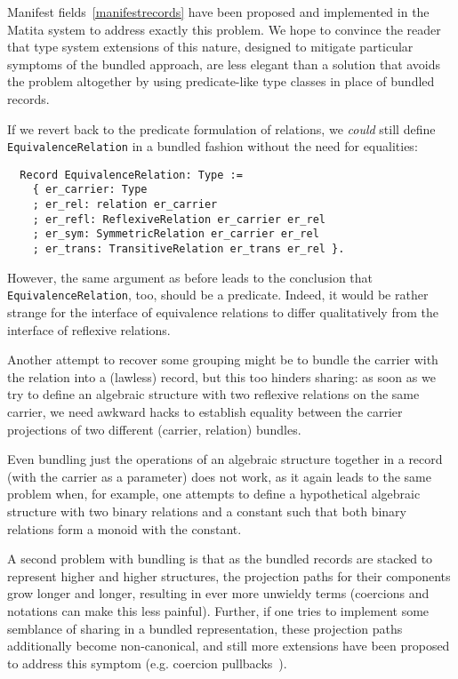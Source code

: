 \documentclass[a4paper,10pt,runningheads]{llncs}
\begin{document}
Manifest fields~\ref{manifestrecords} have been proposed and implemented in the Matita system to address exactly this problem. We hope to convince the reader that type system extensions of this nature, designed to mitigate particular symptoms of the bundled approach, are less elegant than a solution that avoids the problem altogether by using predicate-like type classes in place of bundled records.

If we revert back to the predicate formulation of relations, we \emph{could} still define \lstinline|EquivalenceRelation| in a bundled fashion without the need for equalities:
\begin{lstlisting}
  Record EquivalenceRelation: Type :=
    { er_carrier: Type
    ; er_rel: relation er_carrier
    ; er_refl: ReflexiveRelation er_carrier er_rel
    ; er_sym: SymmetricRelation er_carrier er_rel
    ; er_trans: TransitiveRelation er_trans er_rel }.
\end{lstlisting}
However, the same argument as before leads to the conclusion that \mbox{\lstinline|EquivalenceRelation|,} too, should be a predicate. Indeed, it would be rather strange for the interface of equivalence relations to differ qualitatively from the interface of reflexive relations.

Another attempt to recover some grouping might be to bundle the carrier with the relation into a (lawless) record, but this too hinders sharing: as soon as we try to define an algebraic structure with two reflexive relations on the same carrier, we need awkward hacks to establish equality between the carrier projections of two different (carrier, relation) bundles.

Even bundling just the operations of an algebraic structure together in a record (with the carrier as a parameter) does not work, as it again leads to the same problem when, for example, one attempts to define a hypothetical algebraic structure with two binary relations and a constant such that both binary relations form a monoid with the constant.

A second problem with bundling is that as the bundled records are stacked to represent higher and higher structures, the projection paths for their components grow longer and longer, resulting in ever more unwieldy terms (coercions and notations can make this less painful). Further, if one tries to implement some semblance of sharing in a bundled representation, these projection paths additionally become non-canonical, and still more extensions have been proposed to address this symptom (e.g. coercion pullbacks~\cite{Hints}).
\end{document}
